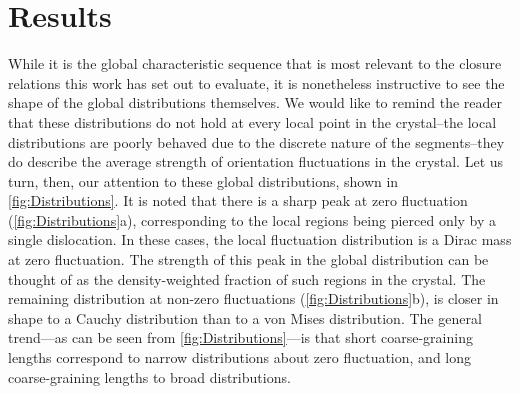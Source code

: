 
\section{Results \label{sec:5_results}}
While it is the global characteristic sequence that is most relevant to the closure relations this work has set out to evaluate, it is nonetheless instructive to see the shape of the global distributions themselves. We would like to remind the reader that these distributions do not hold at every local point in the crystal--the local distributions are poorly behaved due to the discrete nature of the segments--they do describe the average strength of orientation fluctuations in the crystal. Let us turn, then, our attention to these global distributions, shown in \cref{fig:Distributions}. It is noted that there is a sharp peak at zero fluctuation (\cref{fig:Distributions}a), corresponding to the local regions being pierced only by a single dislocation. In these cases, the local fluctuation distribution is a Dirac mass at zero fluctuation. The strength of this peak in the global distribution can be thought of as the density-weighted fraction of such regions in the crystal. The remaining distribution at non-zero fluctuations (\cref{fig:Distributions}b), is closer in shape to a Cauchy distribution than to a von Mises distribution. The general trend---as can be seen from \cref{fig:Distributions}---is that short coarse-graining lengths correspond to narrow distributions about zero fluctuation, and long coarse-graining lengths to broad distributions.

